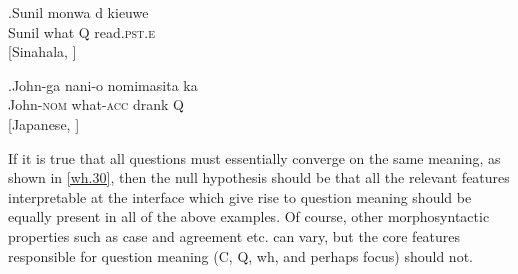 \documentclass{glossa}
\begin{document}
\exg.\label{wh.90}Sunil mon{\textschwa}wa {d\textschwa} kieuwe \\
  Sunil what Q read.\textsc{pst.e} \\
  \hspace{\fill}[Sinahala, \cite{slade:2011}]

\exg.\label{wh.100}John-ga nani-o nomimasita ka \\
  John-\textsc{nom} what-\textsc{acc} drank Q \\
  \hspace{\fill}[Japanese, \cite{hagstrom:1998}]

If it is true that all questions must essentially converge on the same meaning, as shown in \ref{wh.30}, then the null hypothesis should be that all the relevant features interpretable at the interface which give rise to question meaning should be equally present in all of the above examples. Of course, other morphosyntactic properties such as case and agreement etc. can vary, but the core features responsible for question meaning (C, Q, wh, and perhaps focus) should not.
\end{document}
